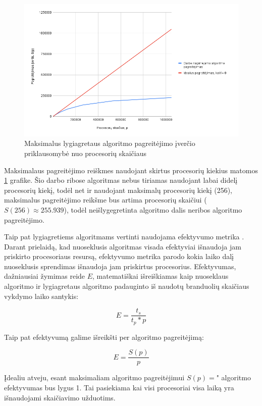 \documentclass{VUMIFPSbakalaurinis}
\begin{document}
\begin{figure}[H]
    \centering
    \includegraphics[scale=0.5]{img/max_speedup.png}
    \caption{Maksimalus lygiagretaus algoritmo pagreitėjimo įverčio priklausomybė nuo procesorių skaičiaus}
    \label{img:max_speedup}
\end{figure}

Maksimalaus pagreitėjimo reiškmes naudojant skirtus procesorių kiekius matomos \ref{img:max_speedup} grafike.
Šio darbo ribose algoritmas nebus tiriamas naudojant labai didelį procesorių kiekį, todėl net ir naudojant maksimalų procesorių kiekį (256),
maksimalus pagreitėjimo reikšme bus artima procesorių skaičiui ($S(256) \approx 255.939$), todėl neišlygegretinta algoritmo dalis neribos algoritmo pagreitėjimo.  

Taip pat lygiagretiems algoritmams vertinti naudojama efektyvumo metrika \cite{eager1989speedup}.
Darant prielaidą, kad nuoseklusis algoritmas visada efektyviai išnaudoja jam priskirto procesoriaus resursą, efektyvumo metrika parodo kokia laiko dalį nuoseklusis sprendimas išnaudoja jam priskirtus procesorius.
Efektyvumas, dažniausiai žymimas reide $E$, matematiškai išreiškiamas kaip nuoseklaus algoritmo ir lygiagretaus algoritmo padauginto iš naudotų branduolių skaičiaus vykdymo laiko santykis:

\[ E = \frac{t_s}{t_p * p}\]

Taip pat efektyvumą galime išreikšti per algoritmo pagreitėjimą:

\[ E = \frac{S(p)}{p}\]

Įdealiu atveju, esant maksimaliam algoritmo pagreitėjimui $S(p)=$" algoritmo efektyvumas bus lygus 1. Tai pasiekiama kai visi procesoriai visa laiką yra išnaudojami skaičiavimo užduotims. 
\end{document}
